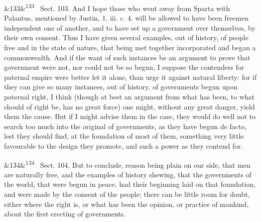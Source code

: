 \documentclass[12pt]{article}
\newcommand{\para}[1][]{\par\noindent\ifx&#1&\else\textsuperscript{\footnotesize #1}~\fi}
\begin{document}
\para[133] Sect. 103. And I hope those who went away from Sparta with Palantus, mentioned by Justin, 1. iii. c. 4. will be allowed to have been freemen independent one of another, and to have set up a government over themselves, by their own consent. Thus I have given several examples, out of history, of people free and in the state of nature, that being met together incorporated and began a commonwealth. And if the want of such instances be an argument to prove that government were not, nor could not be so begun, I suppose the contenders for paternal empire were better let it alone, than urge it against natural liberty: for if they can give so many instances, out of history, of governments begun upon paternal right, I think (though at best an argument from what has been, to what should of right be, has no great force) one might, without any great danger, yield them the cause. But if I might advise them in the case, they would do well not to search too much into the original of governments, as they have begun de facto, lest they should find, at the foundation of most of them, something very little favourable to the design they promote, and such a power as they contend for.

\para[134] Sect. 104. But to conclude, reason being plain on our side, that men are naturally free, and the examples of history shewing, that the governments of the world, that were begun in peace, had their beginning laid on that foundation, and were made by the consent of the people; there can be little room for doubt, either where the right is, or what has been the opinion, or practice of mankind, about the first erecting of governments.
\end{document}
